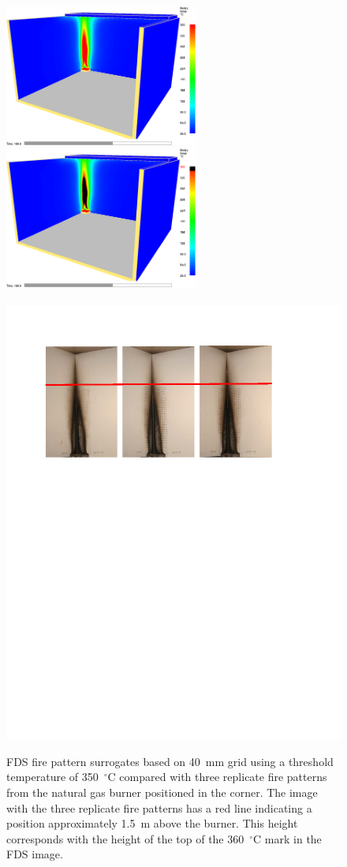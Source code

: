 \documentclass[twoside]{uocthesis}
\begin{document}
{\begin{figure}[h]
  \centering
  \includegraphics[width=2.5in]{../Figures/10}
  \includegraphics[width=2.5in]{../Figures/11}\\
  \hspace{4 mm}  \\ 
  \includegraphics[width=.8\columnwidth]{../Figures/NGCorner_guideline}\\
  \caption[FDS fire pattern surrogates based on 40~mm grid using a threshold temperature of 360~$^\circ$C compared with three replicate fire patterns from the natural gas burner positioned in the corner]{FDS fire pattern surrogates based on 40~mm grid using a threshold temperature of 350~$^\circ$C compared with three replicate fire patterns from the natural gas burner positioned in the corner.  The image with the three replicate fire patterns has a red line indicating a position approximately 1.5~m above the burner.  This height corresponds with the height of the top of the 360~$^\circ$C mark in the FDS image.}
  \label{FDS_FirePattern_Corner_comp}
\end{figure}

}
\end{document}
